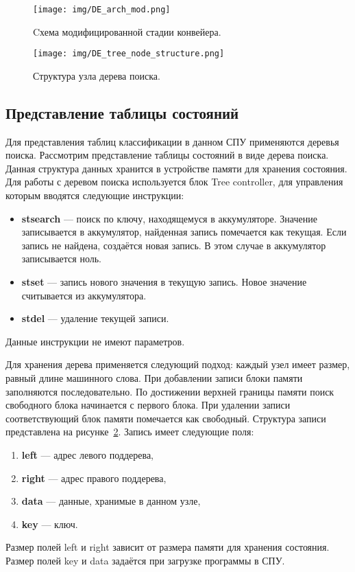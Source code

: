 \documentclass[conference]{IEEEtran}
\begin{document}
\begin{figure}
	\centering
	\texttt{[image: img/DE\_arch\_mod.png]}
	\caption{Cхема модифицированной стадии конвейера.}
	\label{float:arch_mod:DE_Arch}
\end{figure}

\begin{figure}
	\centering
	\texttt{[image: img/DE\_tree\_node\_structure.png]}
	\caption{Структура узла дерева поиска.}
	\label{float:arch_mod:item_structure}
\end{figure}

\subsection{Представление таблицы состояний}
Для представления таблиц классификации в данном СПУ применяются деревья поиска.
Рассмотрим представление таблицы состояний в виде дерева поиска.
Данная структура данных хранится в устройстве памяти для хранения состояния.
Для работы с деревом поиска используется блок Tree controller,
для управления которым вводятся следующие инструкции:
\begin{itemize}
	\item {\bfseries stsearch} --- поиск по ключу, находящемуся в
		аккумуляторе. Значение записывается в аккумулятор,
		найденная запись помечается как текущая. Если запись не
		найдена, создаётся новая запись. В этом случае в
		аккумулятор записывается ноль.
	\item {\bfseries stset} --- запись нового значения в текущую запись.
		Новое значение считывается из аккумулятора.
	\item {\bfseries stdel} --- удаление текущей записи.
\end{itemize}

Данные инструкции не имеют параметров.

Для хранения дерева применяется следующий подход: каждый узел имеет размер,
равный длине машинного слова. При добавлении записи блоки памяти
заполняются последовательно. По достижении верхней границы памяти поиск
свободного блока начинается с первого блока. При удалении записи
соответствующий блок памяти помечается как свободный. Структура записи
представлена на рисунке~\ref{float:arch_mod:item_structure}.
Запись имеет следующие поля:
\begin{enumerate}
	\item {\bfseries left} --- адрес левого поддерева,
	\item {\bfseries right} --- адрес правого поддерева,
	\item {\bfseries data} --- данные, хранимые в данном узле,
	\item {\bfseries key} --- ключ.
\end{enumerate}
Размер полей left и right зависит от размера памяти для хранения состояния.
Размер полей key и data задаётся при загрузке программы в СПУ.
\end{document}
